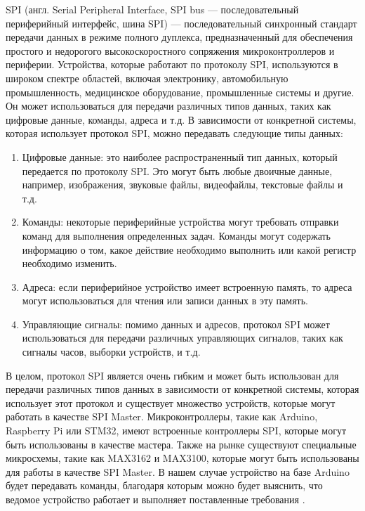 \documentclass[14pt, oneside]{altsu-report}
\begin{document}
	SPI (англ. Serial Peripheral Interface, SPI bus — последовательный периферийный интерфейс, шина SPI) — последовательный синхронный стандарт передачи данных в режиме полного дуплекса, предназначенный для обеспечения простого и недорогого высокоскоростного сопряжения микроконтроллеров и периферии. Устройства, которые работают по протоколу SPI, используются в широком спектре областей, включая электронику, автомобильную промышленность, медицинское оборудование, промышленные системы и другие. Он может использоваться для передачи различных типов данных, таких как цифровые данные, команды, адреса и т.д. В зависимости от конкретной системы, которая использует протокол SPI, можно передавать следующие типы данных:
	\begin{enumerate}
		\item Цифровые данные: это наиболее распространенный тип данных, который передается по протоколу SPI. Это могут быть любые двоичные данные, например, изображения, звуковые файлы, видеофайлы, текстовые файлы и т.д.
		\item Команды: некоторые периферийные устройства могут требовать отправки команд для выполнения определенных задач. Команды могут содержать информацию о том, какое действие необходимо выполнить или какой регистр необходимо изменить.
		\item Адреса: если периферийное устройство имеет встроенную память, то адреса могут использоваться для чтения или записи данных в эту память.
		\item Управляющие сигналы: помимо данных и адресов, протокол SPI может использоваться для передачи различных управляющих сигналов, таких как сигналы часов, выборки устройств, и т.д.
	\end{enumerate}	 
	
	В целом, протокол SPI является очень гибким и может быть использован для передачи различных типов данных в зависимости от конкретной системы, которая использует этот протокол и существует множество устройств, которые могут работать в качестве SPI Master. Микроконтроллеры, такие как Arduino, Raspberry Pi или STM32, имеют встроенные контроллеры SPI, которые могут быть использованы в качестве мастера. Также на рынке существуют специальные микросхемы, такие как MAX3162 и MAX3100, которые могут быть использованы для работы в качестве SPI Master. В нашем случае устройство на базе Arduino будет передавать команды, благодаря которым можно будет выяснить, что ведомое устройство работает и выполняет поставленные требования \cite{felker2010android} \cite{wikiRUGitHub}.
	
\end{document}

